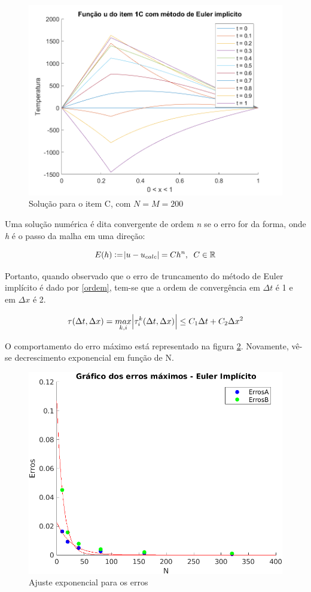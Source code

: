\documentclass[12pt]{article}
\begin{document}
\begin{spacing}{1.5}
\begin{figure}[ht!]
    \centering
    \includegraphics[width=0.45\linewidth]{Segunda_Tarefa/ItemB/itemC_2D.png}
    \caption{Solução para o item C, com $N=M=200$}
    \label{fig:Tarefa2B_itemC_2D}
\end{figure}

Uma solução numérica é dita convergente de ordem \textit{n} se o erro for da forma\supercite{leVeque}, onde \textit{h} é o passo da malha em uma direção:

\begin{equation}\label{erro_proporcional}
    E(h):=\abs{u-u_{calc}}=C h^n, \;\;C \in \mathbb{R}
\end{equation}

Portanto, quando observado que o erro de truncamento do método de Euler implícito é dado por \eqref{ordem}, tem-se que a ordem de convergência em $\Delta t$ é 1 e em $\Delta x$ é 2.

\begin{equation}\label{ordem}
    \tau(\Delta t, \Delta x)= \underset{k,i}{max}\abs{\tau^k_i(\Delta t,\Delta x)} \leq C_1\Delta t + C_2 \Delta x^2
\end{equation}

\clearpage
O comportamento do erro máximo está representado na figura \ref{fig:2B_Fit_Erro}. Novamente, vê-se decrescimento exponencial em função de N.

\begin{figure}[ht!]
    \centering
    \includegraphics[width=0.65\linewidth]{Segunda_Tarefa/ItemB/erro_euler.png}
    \caption{Ajuste exponencial para os erros}
    \label{fig:2B_Fit_Erro}
\end{figure} 


\end{spacing}
\end{document}
